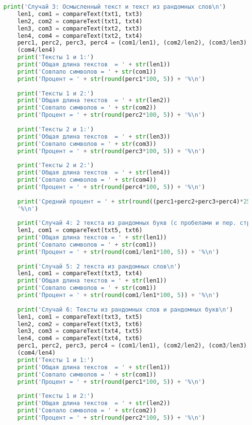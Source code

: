 \documentclass[12pt]{article}
\begin{document}
\begin{lstlisting}[language=Python]
    print('Случай 3: Осмысленный текст и текст из рандомных слов\n')
    len1, com1 = compareText(txt1, txt3)
    len2, com2 = compareText(txt1, txt4)
    len3, com3 = compareText(txt2, txt3)
    len4, com4 = compareText(txt2, txt4)
    perc1, perc2, perc3, perc4 = (com1/len1), (com2/len2), (com3/len3),
    (com4/len4)
    print('Тексты 1 и 1:')
    print('Общая длина текстов  = ' + str(len1))
    print('Совпало символов = ' + str(com1))
    print('Процент = ' + str(round(perc1*100, 5)) + '%\n')
    
    print('Тексты 1 и 2:')
    print('Общая длина текстов  = ' + str(len2))
    print('Совпало символов = ' + str(com2))
    print('Процент = ' + str(round(perc2*100, 5)) + '%\n')
    
    print('Тексты 2 и 1:')
    print('Общая длина текстов  = ' + str(len3))
    print('Совпало символов = ' + str(com3))
    print('Процент = ' + str(round(perc3*100, 5)) + '%\n')
    
    print('Тексты 2 и 2:')
    print('Общая длина текстов  = ' + str(len4))
    print('Совпало символов = ' + str(com4))
    print('Процент = ' + str(round(perc4*100, 5)) + '%\n')
    
    print('Средний процент = ' + str(round((perc1+perc2+perc3+perc4)*25, 5)) +
    '%\n')
    
    print('Случай 4: 2 текста из рандомных букв (с пробелами и пер. строк)\n')
    len1, com1 = compareText(txt5, txt6)
    print('Общая длина текстов = ' + str(len1))
    print('Совпало символов = ' + str(com1))
    print('Процент = ' + str(round(com1/len1*100, 5)) + '%\n')
    
    print('Случай 5: 2 текста из рандомных слов\n')
    len1, com1 = compareText(txt3, txt4)
    print('Общая длина текстов = ' + str(len1))
    print('Совпало символов = ' + str(com1))
    print('Процент = ' + str(round(com1/len1*100, 5)) + '%\n')
    
    print('Случай 6: Тексты из рандомных слов и рандомных букв\n')
    len1, com1 = compareText(txt3, txt5)
    len2, com2 = compareText(txt3, txt6)
    len3, com3 = compareText(txt4, txt5)
    len4, com4 = compareText(txt4, txt6)
    perc1, perc2, perc3, perc4 = (com1/len1), (com2/len2), (com3/len3),
    (com4/len4)
    print('Тексты 1 и 1:')
    print('Общая длина текстов  = ' + str(len1))
    print('Совпало символов = ' + str(com1))
    print('Процент = ' + str(round(perc1*100, 5)) + '%\n')
    
    print('Тексты 1 и 2:')
    print('Общая длина текстов  = ' + str(len2))
    print('Совпало символов = ' + str(com2))
    print('Процент = ' + str(round(perc2*100, 5)) + '%\n')
    

\end{lstlisting}
\end{document}
